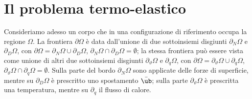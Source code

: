 \section{Il problema termo-elastico}
Consideriamo adesso un corpo che in una configurazione di riferimento occupa la regione $\Omega$. 
La frontiera $\partial\Omega$ è data dall'unione di due sottoinsiemi disgiunti $\partial_N\Omega$ e $\partial_D\Omega$, con $\partial\Omega=\partial_N\Omega\cup\partial_D\Omega$, $\partial_N\Omega\cap\partial_D\Omega=\emptyset$; la stessa frontiera può essere vista come unione di altri due sottoinsiemi disgiunti $\partial_\vartheta\Omega$ e $\partial_q\Omega$, con 
$\partial\Omega=\partial_\vartheta\Omega \cup\partial_q\Omega$, $\partial_\vartheta\Omega \cap\partial_q\Omega=\emptyset$.
Sulla parte del bordo $\partial_N\Omega$ sono applicate delle forze di superficie, mentre su $\partial_D\Omega$ è prescritto uno spostamento $\bar{\ub}$; sulla parte $\partial_\vartheta\Omega$ è prescritta una temperatura, mentre su $\partial_q$ il flusso di calore. 

